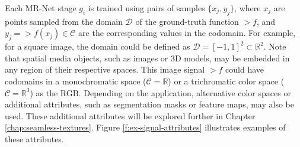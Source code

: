 Each MR-Net stage \( g_i \) is trained using pairs of samples \(\{x_j, y_j\}\), where \( x_j \) are points sampled from the domain \(\mathcal{D}\) of the ground-truth function \(\gt{f}\), and \( y_j = \gt{f}(x_j) \in \mathcal{C} \) are the corresponding values in the codomain. For example, for a square image, the domain could be defined as \(\mathcal{D} = [-1, 1]^2 \subset \mathbb{R}^{2}\). Note that spatial media objects, such as images or 3D models, may be embedded in any region of their respective spaces. This image signal \(\gt{f}\) could have codomains in a monochromatic space (\(\mathcal{C} = \mathbb{R}\)) or a trichromatic color space (\(\mathcal{C} = \mathbb{R}^3\)) as the RGB. Depending on the application, alternative color spaces or additional attributes, such as segmentation masks or feature maps, may also be used. These additional attributes will be explored further in Chapter \ref{chap:seamless-textures}. Figure \ref{f:ex-signal-attributes} illustrates examples of these attributes.

